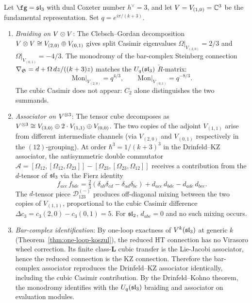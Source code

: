 \begin{proposition}
\label{prop:sl3-monodromy-verification}
Let $\fg = \fsl_3$ with dual Coxeter number $h^\vee = 3$, and let $V = V_{(1,0)} = \mathbb C^3$ be the fundamental representation. Set $q = e^{i\pi/(k+3)}$.
\begin{enumerate}[label=\textup{(\roman*)}]
 \item \emph{Braiding on $V \otimes V$}: The Clebsch--Gordan decomposition $V \otimes V \cong V_{(2,0)} \oplus V_{(0,1)}$ gives split Casimir eigenvalues $\Omega|_{V_{(2,0)}} = 2/3$ and $\Omega|_{V_{(0,1)}} = -4/3$. The monodromy of the bar-complex Steinberg connection $\nabla_{\mathfrak{S}} = d + \Omega\,dz/((k+3)z)$ matches the $U_q(\mathfrak{sl}_3)$ $\check{R}$-matrix:
 \[
 \mathrm{Mon}\big|_{V_{(2,0)}} = q^{4/3},
 \qquad
 \mathrm{Mon}\big|_{V_{(0,1)}} = q^{-8/3}.
 \]
 The cubic Casimir does not appear: $C_2$ alone distinguishes the two summands.

 \item \emph{Associator on $V^{\otimes 3}$}: The tensor cube decomposes as $V^{\otimes 3} \cong V_{(3,0)} \oplus 2\cdot V_{(1,1)} \oplus V_{(0,0)}$. The two copies of the adjoint $V_{(1,1)}$ arise from different intermediate channels \textup{(}via $V_{(2,0)}$ and $V_{(0,1)}$ respectively in the $(12)$-grouping\textup{)}. At order $\hbar^3 = 1/(k+3)^3$ in the Drinfeld--KZ associator, the antisymmetric double commutator $\mathcal{A} = [\Omega_{12}, [\Omega_{12}, \Omega_{23}]] - [\Omega_{23}, [\Omega_{23}, \Omega_{12}]]$ receives a contribution from the $d$-tensor of $\mathfrak{sl}_3$ via the Fierz identity
 \[
 f_{ace}\,f_{bde} = \tfrac{2}{3}(\delta_{ab}\delta_{cd} - \delta_{ad}\delta_{bc}) + d_{ace}\,d_{bde} - d_{ade}\,d_{bce}.
 \]
 The $d$-tensor piece $\mathcal{D}_{123}^{(-)}$ produces off-diagonal mixing between the two copies of $V_{(1,1)}$, proportional to the cubic Casimir difference $\Delta c_3 = c_3(2,0) - c_3(0,1) = 5$. For $\mathfrak{sl}_2$, $d_{abc} = 0$ and no such mixing occurs.

 \item \emph{Bar-complex identification}: By one-loop exactness of $V^k(\mathfrak{sl}_3)$ at generic $k$ \textup{(}Theorem~\textup{\ref{thm:one-loop-koszul})}, the reduced HT connection has no Virasoro wheel correction. Its finite class-$\mathbf L$ cubic transfer is the Lie-Jacobi associator, hence the reduced connection is the KZ connection. Therefore the bar-complex associator reproduces the Drinfeld--KZ associator identically, including the cubic Casimir contribution. By the Drinfeld--Kohno theorem, the monodromy identifies with the $U_q(\mathfrak{sl}_3)$ braiding and associator on evaluation modules.
\end{enumerate}
\end{proposition}

